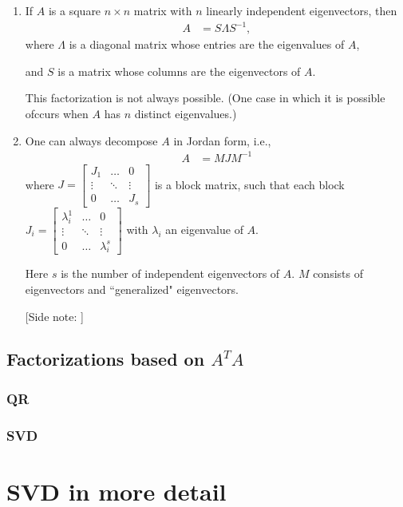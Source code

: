 \begin{enumerate}
\item If $A$ is a square $n\times n$ matrix with $n$ linearly independent eigenvectors, then
    \begin{align*}
        A &= S\Lambda S^{-1},
    \end{align*}
    where $\Lambda$ is a diagonal matrix whose entries are the eigenvalues of $A$,
    
    \medskip
    
    and $S$ is a matrix whose columns are the eigenvectors of $A$.
    
    \medskip
    
    This factorization is not always possible. (One case in which it is possible ofccurs when $A$ has $n$ distinct eigenvalues.)

\item One can always decompose $A$ in Jordan form, i.e.,
    \begin{align*}
        A &= MJM^{-1}
    \end{align*}
    where $J = 
    \begin{bmatrix}
        J_1 & \dots & 0 \\
        \vdots & \ddots & \vdots \\
        0 & \dots & J_s
    \end{bmatrix}
    $ is a block matrix, such that each block \newline
    $J_i = 
    \begin{bmatrix}
        \lambda_i^1 & \dots & 0 \\
        \vdots & \ddots & \vdots \\
        0 & \dots & \lambda_i^s
    \end{bmatrix}
    $ with $\lambda_i$ an eigenvalue of $A$.

    \medskip
    
    Here $s$ is the number of independent eigenvectors of $A$. $M$ consists of eigenvectors and ``generalized" eigenvectors.

    \medskip
    
    [Side note: ]

\end{enumerate}

\subsection{Factorizations based on $A^TA$}

\subsubsection{QR}

\subsubsection{SVD}

\section{SVD in more detail}